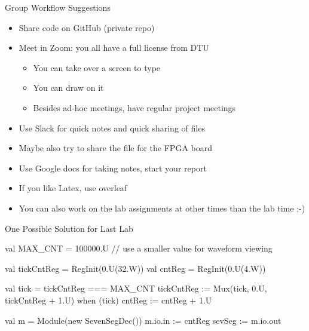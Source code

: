 
\begin{frame}[fragile]{Group Workflow Suggestions}
\begin{itemize}
\item Share code on GitHub (private repo)
\item Meet in Zoom: you all have a full license from DTU
\begin{itemize}
\item You can take over a screen to type
\item You can draw on it
\item Besides ad-hoc meetings, have regular project meetings
\end{itemize}
\item Use Slack for quick notes and quick sharing of files
\item Maybe also try to share the  file for the FPGA board
\item Use Google docs for taking notes, start your report
\item If you like Latex, use overleaf
\item You can also work on the lab assignments at other times than the lab time ;-)
\end{itemize}
\end{frame}


\begin{frame}[fragile]{One Possible Solution for Last Lab}
\begin{chisel}
  val MAX_CNT = 100000.U // use a smaller value for waveform viewing

  val tickCntReg = RegInit(0.U(32.W))
  val cntReg = RegInit(0.U(4.W))

  val tick = tickCntReg === MAX_CNT
  tickCntReg := Mux(tick, 0.U, tickCntReg + 1.U)
  when (tick) {
    cntReg := cntReg + 1.U
  }

  val m = Module(new SevenSegDec())
  m.io.in := cntReg
  sevSeg := m.io.out
\end{chisel}
\end{frame}

